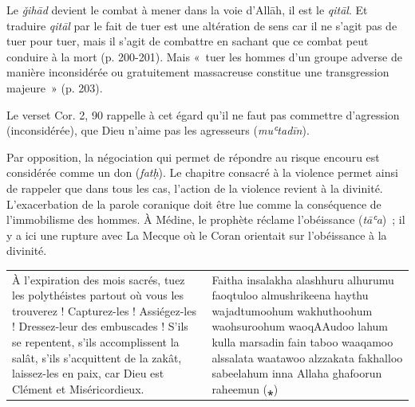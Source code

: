 Le \emph{ǧihād} devient le combat à mener dans la voie d'Allāh, il est
le \emph{qitāl}. Et traduire \emph{qitāl} par le fait de tuer est une
altération de sens car il ne s'agit pas de tuer pour tuer, mais il
s'agit de combattre en sachant que ce combat peut conduire à la mort (p.
200-201). Mais «~tuer les hommes d'un groupe adverse de manière
inconsidérée ou gratuitement massacreuse constitue une transgression
majeure~» (p. 203).





Le verset Cor. 2, 90 rappelle à cet égard qu'il ne faut pas commettre
d'agression (inconsidérée), que Dieu n'aime pas les agresseurs
(\emph{muʿtadīn}).

Par opposition, la négociation qui permet de répondre au risque encouru
est considérée comme un don (\emph{fatḥ}). Le chapitre consacré à la
violence permet ainsi de rappeler que dans tous les cas, l'action de la
violence revient à la divinité. L'exacerbation de la parole coranique
doit être lue comme la conséquence de l'immobilisme des hommes. À
Médine, le prophète réclame l'obéissance (\emph{tāʿa})~; il y a ici une
rupture avec La Mecque où le Coran orientait sur l'obéissance à la
divinité.

\begin{table}[h!]
    \centering
    \small
   \begin{tabular}{p{}p{} }
À l'expiration des mois sacrés, tuez les polythéistes partout où vous
les trouverez ! Capturez-les ! Assiégez-les ! Dressez-leur des
embuscades ! S'ils se repentent, s'ils accomplissent la salât, s'ils
s'acquittent de la zakât, laissez-les en paix, car Dieu est Clément et
Miséricordieux. & Faitha insalakha alashhuru alhurumu faoqtuloo
almushrikeena haythu wajadtumoohum wakhuthoohum waohsuroohum waoqAAudoo
lahum kulla marsadin fain taboo waaqamoo alssalata waatawoo alzzakata
fakhalloo sabeelahum inna Allaha ghafoorun raheemun (⁎) \\
 
\end{tabular}
\end{table}

